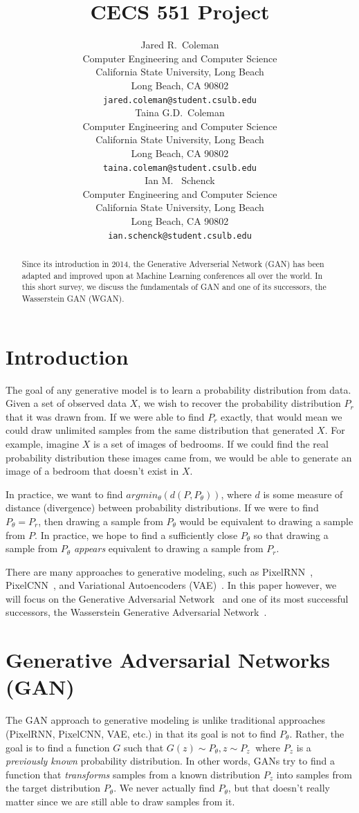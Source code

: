 \documentclass{article}
\title{CECS 551 Project}
\author{%
  Jared R.~Coleman\\
  Computer Engineering and Computer Science\\
  California State University, Long Beach\\
  Long Beach, CA 90802 \\
  \texttt{jared.coleman@student.csulb.edu} \\
  \And 
  Taina G.D.~Coleman\\
  Computer Engineering and Computer Science\\
  California State University, Long Beach\\
  Long Beach, CA 90802 \\
  \texttt{taina.coleman@student.csulb.edu} \\
  \And 
  Ian M. ~Schenck\\
  Computer Engineering and Computer Science\\
  California State University, Long Beach\\
  Long Beach, CA 90802 \\
  \texttt{ian.schenck@student.csulb.edu} \\
}
\begin{document}
\maketitle

\begin{abstract}
   Since its introduction in 2014, the Generative Adverserial Network (GAN) has been adapted and improved upon at Machine Learning conferences all over the world. In this short survey, we discuss the fundamentals of GAN and one of its successors, the Wasserstein GAN (WGAN).
\end{abstract}


\section{Introduction} 
The goal of any generative model is to learn a probability distribution from data. Given a set of observed data $X$, we wish to recover the probability distribution $P_r$ that it was drawn from. If we were able to find $P_r$ exactly, that would mean we could draw unlimited samples from the same distribution that generated $X$. For example, imagine $X$ is a set of images of bedrooms. If we could find the real probability distribution these images came from, we would be able to generate an image of a bedroom that doesn't exist in $X$. 


In practice, we want to find $argmin_\theta(d(P, P_\theta))$, where $d$ is some measure of distance (divergence) between probability distributions. If we were to find $P_\theta=P_r$, then drawing a sample from $P_\theta$ would be equivalent to drawing a sample from $P$. In practice, we hope to find a sufficiently close $P_\theta$ so that drawing a sample from $P_\theta$ \textit{appears} equivalent to drawing a sample from $P_r$.

There are many approaches to generative modeling, such as PixelRNN~\cite{Oord2016}, PixelCNN~\cite{Oord2016a}, and Variational Autoencoders (VAE)~\cite{Pu2016}. In this paper however, we will focus on the Generative Adversarial Network~\cite{Goodfellow2017} and one of its most successful successors, the Wasserstein Generative Adversarial Network~\cite{Arjovsky2017}.

\section{Generative Adversarial Networks (GAN)}

The GAN approach to generative modeling is unlike traditional approaches (PixelRNN, PixelCNN, VAE, etc.) in that its goal is not to find $P_\theta$. Rather, the goal is to find a function $G$ such that $G(z) \sim P_\theta, z \sim P_z~$ where $P_z$ is a \textit{previously known} probability distribution. In other words, GANs try to find a function that \textit{transforms} samples from a known distribution $P_z$ into samples from the target distribution $P_\theta$. We never actually find $P_\theta$, but that doesn't really matter since we are still able to draw samples from it. 
\end{document}
